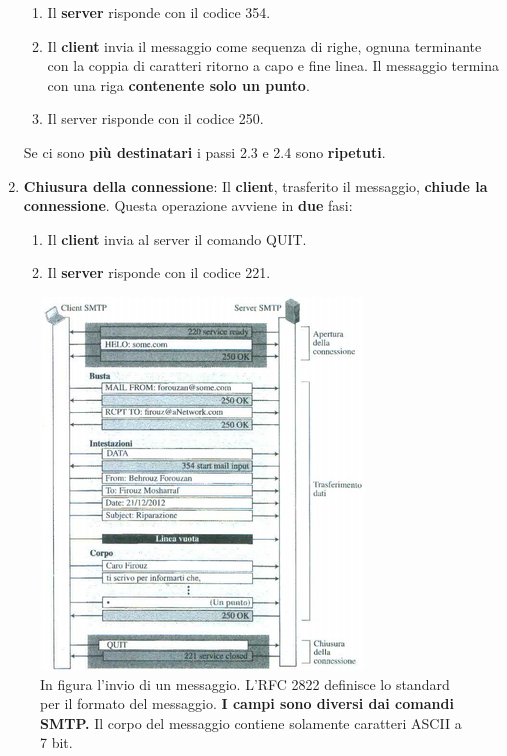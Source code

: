 \documentclass[11pt,a4paper,oneside]{book}
\theoremstyle{definition}
\begin{document}
\begin{enumerate}
\begin{enumerate}[label*=\arabic*.]
		      \item Il \textbf{server} risponde con il codice 354.
		      \item Il \textbf{client} invia il messaggio come sequenza di righe, ognuna terminante con la coppia di caratteri ritorno a capo e fine linea. Il messaggio termina con una riga \textbf{contenente solo un punto}.
		      \item Il server risponde con il codice 250.
	      \end{enumerate}
	      Se ci sono \textbf{più destinatari} i passi 2.3 e 2.4 sono \textbf{ripetuti}.
	\item \textbf{Chiusura della connessione}: Il \textbf{client}, trasferito il messaggio, \textbf{chiude la connessione}. Questa operazione avviene in \textbf{due} fasi:
	      \begin{enumerate}[label*=\arabic*]
		      \item Il \textbf{client} invia al server il comando QUIT.
		      \item Il \textbf{server} risponde con il codice 221.
	      \end{enumerate}
\end{enumerate}

\pagebreak

\begin{figure}[!h]
	\includegraphics[scale=0.8]{Immagini/SMTPes.png}
	\centering
	\caption{In figura l'invio di un messaggio. L'RFC 2822 definisce lo standard per il formato del messaggio. \textbf{I campi sono diversi dai comandi SMTP.} Il corpo del messaggio  contiene solamente caratteri ASCII a 7 bit.}
\end{figure}
\end{document}
